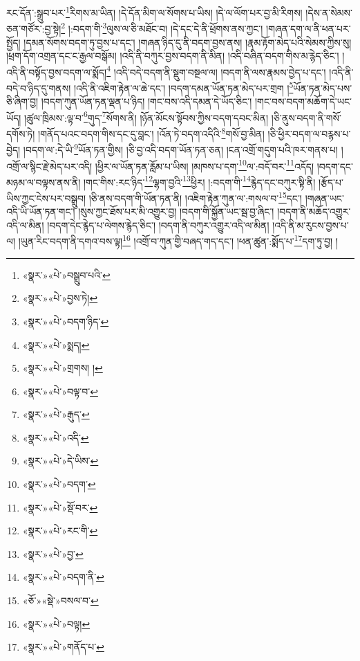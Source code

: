 རང་དོན་:སྒྲུབ་པར་\footnote{«སྣར་»«པེ་»བསྒྲུབ་པའི་}རིགས་མ་ཡིན། །དེ་དོན་མིག་ལ་སོགས་པ་ཡིས། །དེ་ལ་ལོག་པར་བྱ་མི་རིགས། །དེས་ན་སེམས་ཅན་གཙོར་:བྱ་སྟེ།\footnote{«སྣར་»«པེ་»བྱས་ཏེ།} །:བདག་གི་\footnote{«སྣར་»«པེ་»བདག་ཉིད་}ལུས་ལ་ཅི་མཐོང་བ། །དེ་དང་དེ་ནི་ཕྲོགས་ནས་ཀྱང་། །གཞན་དག་ལ་ནི་ཕན་པར་སྤྱོད། །དམན་སོགས་བདག་ཏུ་བྱས་པ་དང་། །གཞན་ཉིད་དུ་ནི་བདག་བྱས་ནས། །རྣམ་རྟོག་མེད་པའི་སེམས་ཀྱིས་སུ། །ཕྲག་དོག་འགྲན་དང་ང་རྒྱལ་བསྒོམ། །འདི་ནི་བཀུར་བྱས་བདག་ནི་མིན། །འདི་བཞིན་བདག་གིས་མ་རྙེད་ཅིང་། །འདི་ནི་བསྟོད་བྱས་བདག་ལ་སྨོད།\footnote{«སྣར་»«པེ་»སྨད།} །འདི་བདེ་བདག་ནི་སྡུག་བསྔལ་ལ། །བདག་ནི་ལས་རྣམས་བྱེད་པ་དང་། །འདི་ནི་བདེ་བ་ཉིད་དུ་གནས། །འདི་ནི་འཇིག་རྟེན་ལ་ཆེ་དང་། །བདག་དམན་ཡོན་ཏན་མེད་པར་གྲག །\footnote{«སྣར་»«པེ་»གྲགས། །}ཡོན་ཏན་མེད་པས་ཅི་ཞིག་བྱ། །བདག་ཀུན་ཡོན་ཏན་ལྡན་པ་ཉིད། །གང་བས་འདི་དམན་དེ་ཡོད་ཅིང་། །གང་བས་བདག་མཆོག་དེ་ཡང་ཡོད། །ཚུལ་ཁྲིམས་:ལྟ་བ་\footnote{«སྣར་»«པེ་»བལྟ་བ་}གུད་\footnote{«སྣར་»«པེ་»རྒུད་}སོགས་ནི། །ཉོན་མོངས་སྟོབས་ཀྱིས་བདག་དབང་མིན། །ཅི་ནུས་བདག་ནི་གསོ་དགོས་ཏེ། །གནོད་པའང་བདག་གིས་དང་དུ་བླང་། །འོན་ཏེ་བདག་འདིའི་\footnote{«སྣར་»«པེ་»འདི་}གསོ་བྱ་མིན། །ཅི་ཕྱིར་བདག་ལ་བརྙས་པ་བྱེད། །བདག་ལ་:དེ་ཡི་\footnote{«སྣར་»«པེ་»དེ་ཡིས་}ཡོན་ཏན་གྱིས། །ཅི་བྱ་འདི་བདག་ཡོན་ཏན་ཅན། །ངན་འགྲོ་གདུག་པའི་ཁར་གནས་པ། །འགྲོ་ལ་སྙིང་རྗེ་མེད་པར་འདི། །ཕྱིར་ལ་ཡོན་ཏན་རློམ་པ་ཡིས། །མཁས་པ་དག་\footnote{«སྣར་»«པེ་»བདག་}ལ་:བདོ་བར་\footnote{«སྣར་»«པེ་»སྡོ་བར་}འདོད། །བདག་དང་མཉམ་ལ་བལྟས་ནས་ནི། །གང་གིས་:རང་ཉིད་\footnote{«སྣར་»«པེ་»རང་གི་}ལྷག་བྱའི་\footnote{«སྣར་»«པེ་»བྱ་}ཕྱིར། །:བདག་གི་\footnote{«སྣར་»«པེ་»བདག་ནི་}རྙེད་དང་བཀུར་སྟི་ནི། །རྩོད་པ་ཡིས་ཀྱང་ངེས་པར་བསྒྲུབ། །ཅི་ནས་བདག་གི་ཡོན་ཏན་ནི། །འཇིག་རྟེན་ཀུན་ལ་:གསལ་བ་\footnote{«ཅོ་»«སྡེ་»བསལ་བ་}དང་། །གཞན་ཡང་འདི་ཡི་ཡོན་ཏན་གང་། །སུས་ཀྱང་ཐོས་པར་མི་འགྱུར་བྱ། །བདག་གི་སྐྱོན་ཡང་སྦ་བྱ་ཞིང་། །བདག་ནི་མཆོད་འགྱུར་འདི་ལ་མིན། །བདག་དེང་རྙེད་པ་ལེགས་རྙེད་ཅིང་། །བདག་ནི་བཀུར་འགྱུར་འདི་ལ་མིན། །འདི་ནི་མ་རུངས་བྱས་པ་ལ། །ཡུན་རིང་བདག་ནི་དགའ་བས་ལྟ།\footnote{«སྣར་»«པེ་»བལྟ།} །འགྲོ་བ་ཀུན་གྱི་བཞད་གད་དང་། །ཕན་ཚུན་:སྨོད་པ་\footnote{«སྣར་»«པེ་»གནོད་པ་}དག་ཏུ་བྱ། །
